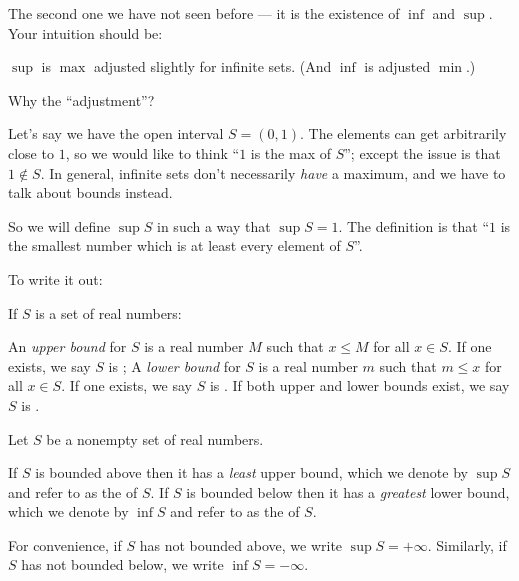 The second one we have not seen before --- it is the
existence of $\inf$ and $\sup$.
Your intuition should be:
\begin{moral}
	$\sup$ is $\max$ adjusted slightly for infinite sets.
	(And $\inf$ is adjusted $\min$.)
\end{moral}
Why the ``adjustment''?
\begin{example}
	Let's say we have the open interval $S = (0,1)$.
	The elements can get arbitrarily close to $1$,
	so we would like to think ``$1$ is the max of $S$'';
	except the issue is that $1 \notin S$.
	In general, infinite sets don't necessarily \emph{have}
	a maximum, and we have to talk about bounds instead.

	So we will define $\sup S$ in such a way that $\sup S = 1$.
	The definition is that ``$1$ is the smallest number
	which is at least every element of $S$''.
\end{example}
To write it out:
\begin{definition}
	If $S$ is a set of real numbers:
	\begin{itemize}
		\ii An \emph{upper bound} for $S$ is a real number $M$
		such that $x \le M$ for all $x \in S$.
		If one exists, we say $S$ is ;
		\ii A \emph{lower bound} for $S$ is a real number $m$
		such that $m \le x$ for all $x \in S$.
		If one exists, we say $S$ is .
		\ii If both upper and lower bounds exist,
		we say $S$ is .
	\end{itemize}
\end{definition}
\begin{theorem}
	\label{thm:inf_sup}
	Let $S$ be a nonempty set of real numbers.
	\begin{itemize}
		\ii If $S$ is bounded above
		then it has a \emph{least} upper bound,
		which we denote by $\sup S$
		and refer to as the  of $S$.
		\ii If $S$ is bounded below
		then it has a \emph{greatest} lower bound,
		which we denote by $\inf S$
		and refer to as the  of $S$.
	\end{itemize}
\end{theorem}

\begin{definition}
	For convenience, if $S$ has not bounded above, we write $\sup S = +\infty$.
	Similarly, if $S$ has not bounded below, we write $\inf S = -\infty$.
\end{definition}

